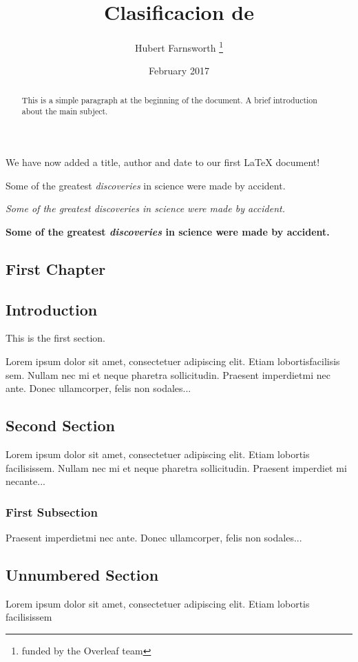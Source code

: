 \documentclass[12pt, letterpaper, twoside]{article}
\title{Clasificacion de }
\author{Hubert Farnsworth \thanks{funded by the Overleaf team}}
\date{February 2017}
\begin{document}
 
\maketitle
 

 
\begin{abstract}
This is a simple paragraph at the beginning of the 
document. A brief introduction about the main subject.
\end{abstract}

\begin{introduction}
We have now added a title, author and date to our first \LaTeX{} document!
 

Some of the greatest \emph{discoveries} 
in science 
were made by accident.
 
\textit{Some of the greatest \emph{discoveries} 
in science 
were made by accident.}
 
\textbf{Some of the greatest \emph{discoveries} 
in science 
were made by accident.}

\end{introduction}

\begin{content}
\chapter{First Chapter}
 
\section{Introduction}
 
This is the first section.
 
Lorem  ipsum  dolor  sit  amet,  consectetuer  adipiscing  
elit.   Etiam  lobortisfacilisis sem.  Nullam nec mi et 
neque pharetra sollicitudin.  Praesent imperdietmi nec ante. 
Donec ullamcorper, felis non sodales...
 
\section{Second Section}
 
Lorem ipsum dolor sit amet, consectetuer adipiscing elit.  
Etiam lobortis facilisissem.  Nullam nec mi et neque pharetra 
sollicitudin.  Praesent imperdiet mi necante...
 
\subsection{First Subsection}
Praesent imperdietmi nec ante. Donec ullamcorper, felis non sodales...
 
\section*{Unnumbered Section}
Lorem ipsum dolor sit amet, consectetuer adipiscing elit.  
Etiam lobortis facilisissem
\end{content}
\end{document}
